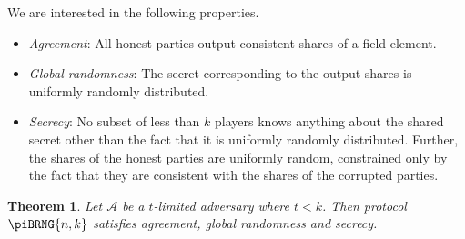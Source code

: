 \documentclass{article}
\newtheorem{theorem}{Theorem}
\theoremstyle{remark}
\begin{document}
We are interested in the following properties.

\begin{itemize}
	\item \textit{Agreement}: All honest parties output consistent shares of a
		field element.

	\item \textit{Global randomness}: The secret corresponding to the output
		shares is uniformly randomly distributed.

	\item \textit{Secrecy}: No subset of less than $k$ players knows anything
		about the shared secret other than the fact that it is uniformly
		randomly distributed. Further, the shares of the honest parties are
		uniformly random, constrained only by the fact that they are consistent
		with the shares of the corrupted parties.
\end{itemize}

\begin{theorem}
	Let $\mathcal{A}$ be a $t$-limited adversary where $t < k$. Then protocol
	$\piBRNG{n,k}$ satisfies agreement, global randomness and secrecy.
\end{theorem}
\end{document}
